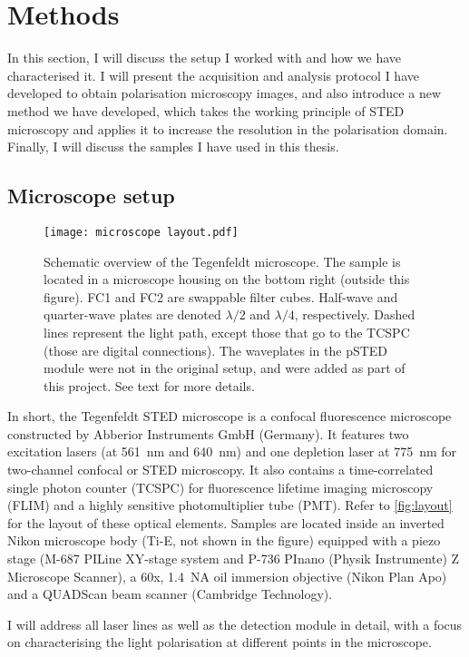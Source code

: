 \chapter{Methods}

In this section, I will discuss the setup I worked with and how we have characterised it. I will present the acquisition and analysis protocol I have developed to obtain polarisation microscopy images, and also introduce a new method we have developed, which takes the working principle of STED microscopy and applies it to increase the resolution in the polarisation domain. Finally, I will discuss the samples I have used in this thesis.

\section{Microscope setup}

\begin{figure}[bh]
	\centering
	\texttt{[image: microscope layout.pdf]}
	\caption{
		Schematic overview of the Tegenfeldt microscope. The sample is located in a microscope housing on the bottom right (outside this figure). FC1 and FC2 are swappable filter cubes. Half-wave and quarter-wave plates are denoted $ \lambda/2 $ and $ \lambda/4 $, respectively. Dashed lines represent the light path, except those that go to the TCSPC (those are digital connections). The waveplates in the pSTED module were not in the original setup, and were added as part of this project. See text for more details.
	}
	\label{fig:layout}
\end{figure}

In short, the Tegenfeldt STED microscope is a confocal fluorescence microscope constructed by Abberior Instruments GmbH (Germany). It features two excitation lasers (at 561~nm and 640~nm) and one depletion laser at 775~nm for two-channel confocal or STED microscopy. It also contains a time-correlated single photon counter (TCSPC) for fluorescence lifetime imaging microscopy (FLIM) and a highly sensitive photomultiplier tube (PMT). Refer to \autoref{fig:layout} for the layout of these optical elements. Samples are located inside an inverted Nikon microscope body (Ti-E, not shown in the figure) equipped with a piezo stage (M-687 PILine XY-stage system and P-736 PInano (Physik Instrumente) Z Microscope Scanner), a 60x, 1.4~NA oil immersion objective (Nikon Plan Apo) and a QUADScan beam scanner (Cambridge Technology).

I will address all laser lines as well as the detection module in detail, with a focus on characterising the light polarisation at different points in the microscope.

